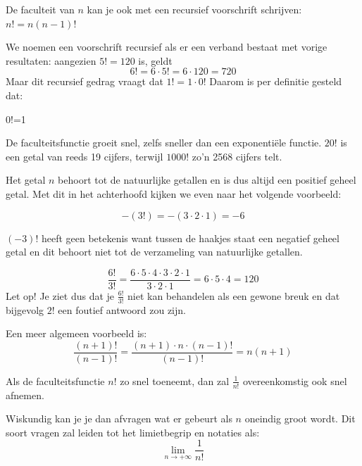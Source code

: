 De faculteit van $n$ kan je ook met een recursief voorschrift schrijven: $n!=n(n-1)!$

We noemen een voorschrift recursief als er een verband bestaat met vorige resultaten: aangezien $5!=120$ is, geldt
\begin{equation*}
6!=6\cdot 5!=6\cdot 120=720
\end{equation*}
Maar dit recursief gedrag vraagt dat $1!=1\cdot 0!$ Daarom is per definitie gesteld dat:

\begin{definitie}
	0!=1
\end{definitie}

De faculteitsfunctie groeit snel, zelfs sneller dan een exponenti\"ele functie.  $20!$ is een getal van reeds 19 cijfers, terwijl $1000!$ zo'n 2568 cijfers telt.

Het getal $n$ behoort tot de natuurlijke getallen en is dus altijd een positief geheel getal.
Met dit in het achterhoofd kijken we even naar het volgende voorbeeld:

\begin{equation*}
-(3!)=-(3\cdot 2\cdot 1)=-6
\end{equation*}

$(-3)!$ heeft geen betekenis want tussen de haakjes staat een negatief geheel getal en dit behoort niet tot de verzameling van natuurlijke getallen.

\begin{voorbeeld}
	\begin{equation*}
	\frac{6!}{3!}=\frac{6\cdot 5\cdot 4\cdot 3\cdot 2\cdot 1}{3\cdot 2\cdot 1} = 6\cdot 5\cdot 4 = 120
	\end{equation*}
	Let op! Je ziet dus dat je $\frac{6!}{3!}$ niet kan behandelen als een gewone breuk en dat bijgevolg $2!$ een foutief antwoord zou zijn.
\end{voorbeeld}

\begin{voorbeeld}
Een meer algemeen voorbeeld is:
\begin{equation*}
\frac{(n+1)!}{(n-1)!}=\frac{(n+1) \cdot n\cdot (n-1)!}{(n-1)!}=n(n+1)
\end{equation*}
\end{voorbeeld}

Als de faculteitsfunctie $n!$ zo snel toeneemt, dan zal $\frac{1}{n!}$ overeenkomstig ook snel afnemen.

Wiskundig kan je je dan afvragen wat er gebeurt als $n$ oneindig groot wordt. Dit soort vragen zal leiden tot het limietbegrip en notaties als:
\begin{equation*}
\lim\limits_{n \to +\infty} \frac{1}{n!}
\end{equation*}

